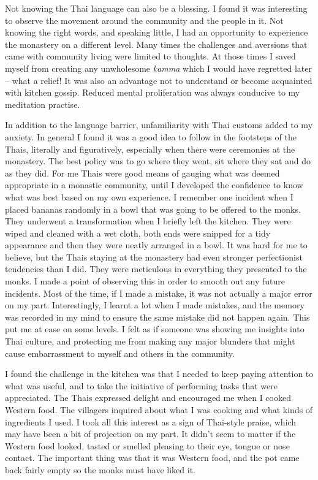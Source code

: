 Not knowing the Thai language can also be a blessing. I found it was
interesting to observe the movement around the community and the people
in it. Not knowing the right words, and speaking little, I had an
opportunity to experience the monastery on a different level. Many times
the challenges and aversions that came with community living were
limited to thoughts. At those times I saved myself from creating any
unwholesome \emph{kamma} which I would have regretted later -- what a
relief! It was also an advantage not to understand or become acquainted
with kitchen gossip. Reduced mental proliferation was always conducive
to my meditation practise. 

In addition to the language barrier, unfamiliarity with Thai customs
added to my anxiety. In general I found it was a good idea to follow in
the footsteps of the Thais, literally and figuratively, especially when
there were ceremonies at the monastery. The best policy was to go where
they went, sit where they sat and do as they did. For me Thais were good
means of gauging what was deemed appropriate in a monastic community, 
until I developed the confidence to know what was best based on my own
experience. I remember one incident when I placed bananas randomly in a
bowl that was going to be offered to the monks. They underwent a
transformation when I briefly left the kitchen. They were wiped and
cleaned with a wet cloth, both ends were snipped for a tidy appearance
and then they were neatly arranged in a bowl. It was hard for me to
believe, but the Thais staying at the monastery had even stronger
perfectionist tendencies than I did. They were meticulous in everything
they presented to the monks. I made a point of observing this in order
to smooth out any future incidents. Most of the time, if I made a
mistake, it was not actually a major error on my part. Interestingly, I
learnt a lot when I made mistakes, and the memory was recorded in my
mind to ensure the same mistake did not happen again. This put me at
ease on some levels. I felt as if someone was showing me insights into
Thai culture, and protecting me from making any major blunders that
might cause embarrassment to myself and others in the community. 

I found the challenge in the kitchen was that I needed to keep paying
attention to what was useful, and to take the initiative of performing
tasks that were appreciated. The Thais expressed delight and encouraged
me when I cooked Western food. The villagers inquired about what I was
cooking and what kinds of ingredients I used. I took all this interest
as a sign of Thai-style praise, which may have been a bit of projection
on my part. It didn't seem to matter if the Western food looked, tasted
or smelled pleasing to their eye, tongue or nose contact. The important
thing was that it was Western food, and the pot came back fairly empty
so the monks must have liked it. 

